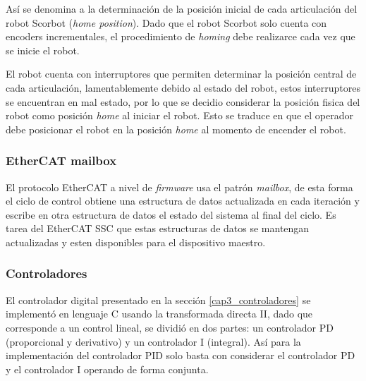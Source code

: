 Así se denomina a la determinación de la posición inicial de cada articulación del robot Scorbot (\textit{home position}). Dado que el robot Scorbot solo cuenta con encoders incrementales, el procedimiento de \textit{homing} debe realizarce cada vez que se inicie el robot.

El robot cuenta con interruptores que permiten determinar la posición central de cada articulación, lamentablemente debido al estado del robot, estos interruptores se encuentran en mal estado, por lo que se decidio considerar la posición fisica del robot como posición \textit{home} al iniciar el robot. Esto se traduce en que el operador debe posicionar el robot en la posición \textit{home} al momento de encender el robot.

\subsubsection{EtherCAT mailbox}

El protocolo EtherCAT a nivel de \textit{firmware} usa el patrón \textit{mailbox}, de esta forma el ciclo de control obtiene una estructura de datos actualizada en cada iteración y escribe en otra estructura de datos el estado del sistema al final del ciclo. Es tarea del EtherCAT SSC que estas estructuras de datos se mantengan actualizadas y esten disponibles para el dispositivo maestro.
 
\subsubsection{Controladores}

El controlador digital presentado en la sección \ref{cap3_controladores} se implementó en lenguaje C usando la transformada directa II, dado que corresponde a un control lineal, se dividió en dos partes: un controlador PD (proporcional y derivativo) y un controlador I (integral). Así para la implementación del controlador PID solo basta con considerar el controlador PD y el controlador I operando de forma conjunta.

